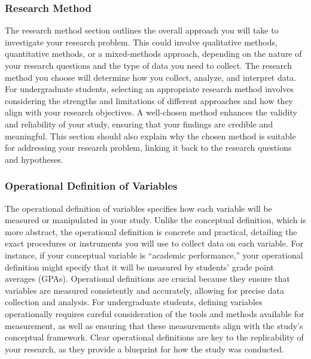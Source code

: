 \documentclass[
]{book}
\begin{document}
\subsubsection*{Research Method}\label{research-method}

The research method section outlines the overall approach you will take to investigate your research problem. This could involve qualitative methods, quantitative methods, or a mixed-methods approach, depending on the nature of your research questions and the type of data you need to collect. The research method you choose will determine how you collect, analyze, and interpret data. For undergraduate students, selecting an appropriate research method involves considering the strengths and limitations of different approaches and how they align with your research objectives. A well-chosen method enhances the validity and reliability of your study, ensuring that your findings are credible and meaningful. This section should also explain why the chosen method is suitable for addressing your research problem, linking it back to the research questions and hypotheses.

\subsubsection*{Operational Definition of Variables}\label{operational-definition-of-variables}

The operational definition of variables specifies how each variable will be measured or manipulated in your study. Unlike the conceptual definition, which is more abstract, the operational definition is concrete and practical, detailing the exact procedures or instruments you will use to collect data on each variable. For instance, if your conceptual variable is ``academic performance,'' your operational definition might specify that it will be measured by students' grade point averages (GPAs). Operational definitions are crucial because they ensure that variables are measured consistently and accurately, allowing for precise data collection and analysis. For undergraduate students, defining variables operationally requires careful consideration of the tools and methods available for measurement, as well as ensuring that these measurements align with the study's conceptual framework. Clear operational definitions are key to the replicability of your research, as they provide a blueprint for how the study was conducted.
\end{document}
